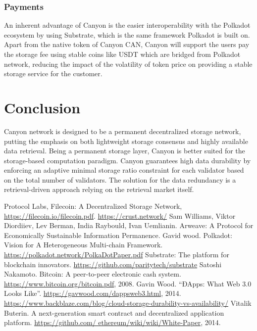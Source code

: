 \documentclass[]{article}
\begin{document}
\subsubsection{Payments}

An inherent advantage of Canyon is the easier interoperability with the Polkadot\cite{polkadot} ecosystem by using Substrate\cite{substrate}, which is the same framework Polkadot is built on. Apart from the native token of Canyon CAN, Canyon will support the users pay the storage fee using stable coins like USDT which are bridged from Polkadot network, reducing the impact of the volatility of token price on providing a stable storage service for the customer.

\section{Conclusion}

Canyon network is designed to be a permanent decentralized storage network, putting the emphasis on both lightweight storage consensus and highly available data retrieval. Being a permanent storage layer, Canyon is better suited for the storage-based computation paradigm. Canyon guarantees high data durability by enforcing an adaptive minimal storage ratio constraint for each validator based on the total number of validators. The solution for the data redundancy is a retrieval-driven approach relying on the retrieval market itself.

\begin{thebibliography}{99}
Protocol Labs, Filecoin: A Decentralized Storage Network, \url{https://filecoin.io/filecoin.pdf}.
\url{https://crust.network/}
Sam Williams, Viktor Diordiiev, Lev Berman, India Raybould, Ivan Uemlianin. Arweave: A Protocol for Economically Sustainable Information Permanence.
Gavid wood. Polkadot: Vision for A Heterogeneous Multi-chain Framework. \url{https://polkadot.network/PolkaDotPaper.pdf}
Substrate: The platform for blockchain innovators. \url{https://github.com/paritytech/substrate}
Satoshi Nakamoto. Bitcoin: A peer-to-peer electronic cash system. \url{https://www.bitcoin.org/bitcoin.pdf}, 2008.
Gavin Wood. “ĐApps: What Web 3.0 Looks Like”. \url{https://gavwood.com/dappsweb3.html}, 2014.
\url{https://www.backblaze.com/blog/cloud-storage-durability-vs-availability/}
Vitalik Buterin. A next-generation smart contract and decentralized application platform. \url{https://github.com/
ethereum/wiki/wiki/White-Paper}, 2014.
\end{thebibliography}
\end{document}
